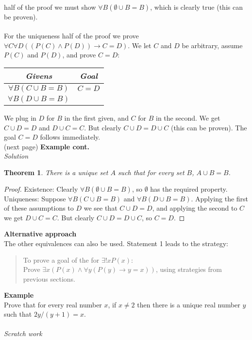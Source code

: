 \documentclass{report}
\newtheorem*{theorem}{Theorem}
\theoremstyle{definition}
\begin{document}
half of the proof we must show $\forall B(\emptyset\cup B=B)$, which is clearly true (this can be proven).\\
\vspace{1mm}\\
For the uniqueness half of the proof we prove $\forall C\forall D((P(C)\land P(D))\to C=D)$. We let $C$ and $D$ be arbitrary, assume $P(C)$ and $P(D)$, and prove $C=D$:
\begin{center}
\begin{tabular}{c|c}
\textit{Givens}&\textit{Goal}\\
\hline
$\forall B(C\cup B=B)$&$C=D$\\
$\forall B(D\cup B=B)$&
\end{tabular}
\end{center}
We plug in $D$ for $B$ in the first given, and $C$ for $B$ in the second. We get $C\cup D=D$ and $D\cup C=C$. But clearly $C\cup D=D\cup C$ (this can be proven). 
The goal $C=D$ follows immediately.\\
(next page)\newpage
\noindent\textbf{Example cont.}\\
\textit{Solution}
\begin{theorem}
There is a unique set $A$ such that for every set $B$, $A\cup B=B$.
\end{theorem}
\begin{proof}
Existence: Clearly $\forall B(\emptyset\cup B=B)$, so $\emptyset$ has the required property.\\
\indent Uniqueness: Suppose $\forall B(C\cup B=B)$ and $\forall B(D\cup B=B)$. Applying the first of these assumptions to $D$ we see that $C\cup D=D$, and applying the second to $C$ we get 
$D\cup C=C$. But clearly $C\cup D=D\cup C$, so $C=D$.
\end{proof}
\noindent\textbf{Alternative approach}\\
The other equivalences can also be used. Statement 1 leads to the strategy:
\begin{quote}
To prove a goal of the for $\exists!xP(x)$:\\
Prove $\exists x(P(x)\land\forall y(P(y)\to y=x))$, using strategies from previous sections.
\end{quote}
\textbf{Example}\\
Prove that for every real number $x$, if $x\neq2$ then there is a unique real number $y$ such that $2y/(y+1)=x$.\\
\vspace{1mm}\\
\textit{Scratch work}\\
\end{document}
